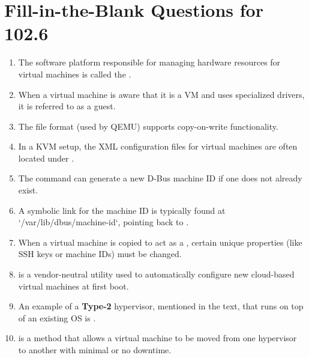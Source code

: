\documentclass[a4paper]{report}
\begin{document}

\newpage
\section*{Fill-in-the-Blank Questions for 102.6}

\begin{enumerate}[1.]
\item The software platform responsible for managing hardware resources for virtual machines is called the \underline{\hspace{2cm}}.

\item When a virtual machine is aware that it is a VM and uses specialized drivers, it is referred to as a \underline{\hspace{2cm}} guest.

\item The \underline{\hspace{2cm}} file format (used by QEMU) supports copy-on-write functionality.

\item In a KVM setup, the XML configuration files for virtual machines are often located under \underline{\hspace{2cm}}.

\item The \underline{\hspace{2cm}} command can generate a new D-Bus machine ID if one does not already exist.

\item A symbolic link for the machine ID is typically found at `/var/lib/dbus/machine-id`, pointing back to \underline{\hspace{2cm}}.

\item When a virtual machine is copied to act as a \underline{\hspace{2cm}}, certain unique properties (like SSH keys or machine IDs) must be changed.

\item \underline{\hspace{2cm}} is a vendor-neutral utility used to automatically configure new cloud-based virtual machines at first boot.

\item An example of a \textbf{Type-2} hypervisor, mentioned in the text, that runs on top of an existing OS is \underline{\hspace{2cm}}.

\item \underline{\hspace{2cm}} is a method that allows a virtual machine to be moved from one hypervisor to another with minimal or no downtime.
\end{enumerate}
\end{document}
